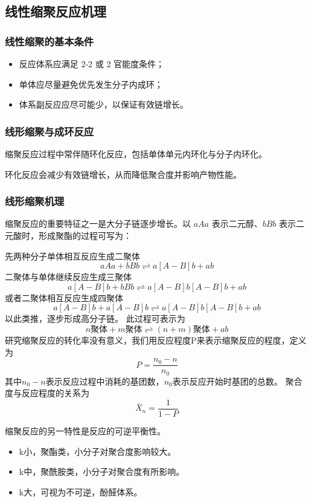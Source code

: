 ﻿\documentclass[12pt,a4paper]{article}
\begin{document}
\subsection{线性缩聚反应机理}
\subsubsection{线性缩聚的基本条件}
\begin{itemize}
  \item 反应体系应满足 2-2 或 2 官能度条件；
  \item 单体应尽量避免优先发生分子内成环；
  \item 体系副反应应尽可能少，以保证有效链增长。
\end{itemize}

\subsubsection{线形缩聚与成环反应}
缩聚反应过程中常伴随环化反应，包括单体单元内环化与分子内环化。

环化反应会减少有效链增长，从而降低聚合度并影响产物性能。
\subsubsection{线形缩聚机理}
缩聚反应的重要特征之一是大分子链逐步增长。以 $aAa$ 表示二元醇、$bBb$ 表示二元酸时，形成聚酯的过程可写为：

先两种分子单体相互反应生成二聚体$$aAa+bBb\rightleftharpoons a\left[A-B\right]b+ab$$
二聚体与单体继续反应生成三聚体$$a\left[A-B\right]b+bBb\rightleftharpoons a\left[A-B\right]b\left[A-B\right]b+ab$$
或者二聚体相互反应生成四聚体$$a\left[A-B\right]b+a\left[A-B\right]b\rightleftharpoons a\left[A-B\right]b\left[A-B\right]b+ab$$
以此类推，逐步形成高分子链。
此过程可表示为$$n{\text{聚体}}+m{\text{聚体}}\rightleftharpoons (n+m){\text{聚体}}+ab$$
研究缩聚反应的转化率没有意义，我们用反应程度P来表示缩聚反应的程度，定义为$$P=\frac{n_0-n}{n_0}$$
其中$n_0-n$表示反应过程中消耗的基团数，$n_0$表示反应开始时基团的总数。
聚合度与反应程度的关系为$$\bar{X}_n=\frac{1}{1-P}$$

缩聚反应的另一特性是反应的可逆平衡性。
\begin{itemize}
  \item k小，聚酯类，小分子对聚合度影响较大。
  \item k中，聚酰胺类，小分子对聚合度有所影响。
  \item k大，可视为不可逆，酚醛体系。
\end{itemize}
\end{document}
